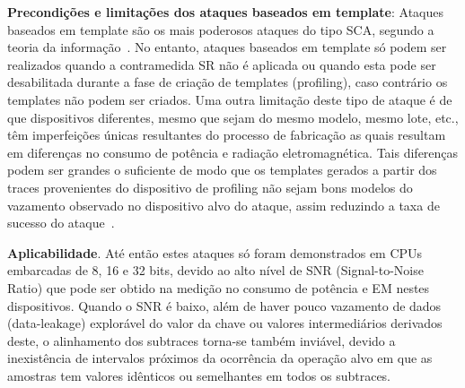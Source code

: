 \noindent \textbf{Precondições e limitações dos ataques baseados em template}: Ataques baseados em template são os mais poderosos ataques do tipo SCA, segundo a teoria da informação~\cite{ChariRaoRohatgi2003}. No entanto, ataques baseados em template só podem ser realizados quando a contramedida SR não é aplicada ou quando esta pode ser desabilitada durante a fase de criação de templates (profiling), caso contrário os templates não podem ser criados. Uma outra limitação deste tipo de ataque é de que dispositivos diferentes, mesmo que sejam do mesmo modelo, mesmo lote, etc., têm imperfeições únicas resultantes do processo de fabricação as quais resultam em diferenças no consumo de potência e radiação eletromagnética. Tais diferenças podem ser grandes o suficiente de modo que os templates gerados a partir dos traces provenientes do dispositivo de profiling não sejam bons modelos do vazamento observado no dispositivo alvo do ataque, assim reduzindo a taxa de sucesso do ataque~\cite{ElaabidGuilley2012}.


\noindent \textbf{Aplicabilidade}. Até então estes ataques só foram demonstrados em CPUs embarcadas de 8, 16 e 32 bits, devido ao alto nível de SNR (Signal-to-Noise Ratio) que pode ser obtido na medição no consumo de potência e EM nestes dispositivos. Quando o SNR é baixo, além de haver pouco vazamento de dados (data-leakage) explorável do valor da chave ou valores intermediários derivados deste, o alinhamento dos subtraces torna-se também inviável, devido a inexistência de intervalos próximos da ocorrência da operação alvo em que as amostras tem valores idênticos ou semelhantes em todos os subtraces.
